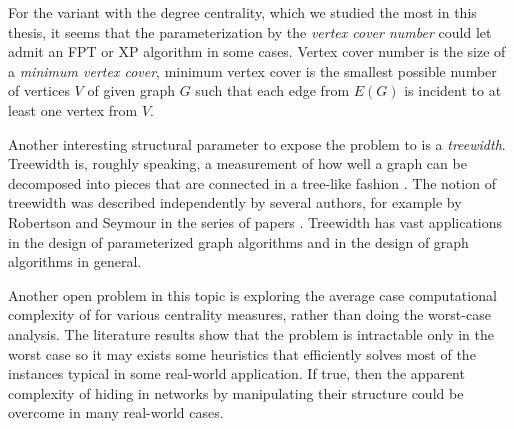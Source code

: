 For the variant with the degree centrality, which we studied the most in this thesis,
it seems that the parameterization by the \emph{vertex cover number} could let \HL admit an FPT or XP algorithm in some cases.
Vertex cover number is the size of a \emph{minimum vertex cover},
minimum vertex cover is the smallest possible number of vertices $V$ of given graph $G$ such that each edge from $E(G)$ is incident
to at least one vertex from $V$.

Another interesting structural parameter to expose the problem to is a \emph{treewidth}.
Treewidth is, roughly speaking, a measurement of how well a graph can be decomposed into pieces that are connected in a
tree-like fashion \cite[p.~151]{Cygan2015}.
The notion of treewidth was described independently by several authors,
for example by Robertson and Seymour in the series of papers \cite{Robertson1984,Robertson1986.2,Robertson1986.5}. 
Treewidth has vast applications in the design of parameterized graph algorithms and
in the design of graph algorithms in general.

Another open problem in this topic is exploring the average case computational complexity of \HL for various centrality measures,
rather than doing the worst-case analysis.
The literature results show that the problem is intractable only in the worst case so
it may exists some heuristics that efficiently solves most of the instances typical in some real-world application.
If true, then the apparent complexity of hiding in networks by manipulating their structure
could be overcome in many real-world cases.~\cite{Dey2019}
